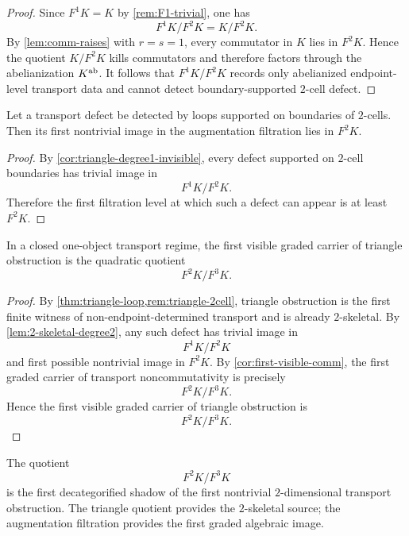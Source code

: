 \begin{proof}
	Since \(F^1K=K\) by \cref{rem:F1-trivial}, one has
	\[
		F^1K/F^2K=K/F^2K.
	\]
	By \cref{lem:comm-raises} with \(r=s=1\), every commutator in \(K\)
	lies in \(F^2K\).  Hence the quotient \(K/F^2K\) kills commutators and
	therefore factors through the abelianization \(K^{\operatorname{ab}}\).  It follows
	that \(F^1K/F^2K\) records only abelianized endpoint-level transport
	data and cannot detect boundary-supported \(2\)-cell defect.
\end{proof}
\begin{lemma}
	\label{lem:2-skeletal-degree2}
	Let a transport defect be detected by loops supported on boundaries of
	\(2\)-cells.  Then its first nontrivial image in the augmentation
	filtration lies in \(F^2K\).
\end{lemma}
\begin{proof}
	By \cref{cor:triangle-degree1-invisible}, every defect supported on
	\(2\)-cell boundaries has trivial image in
	\[
		F^1K/F^2K.
	\]
	Therefore the first filtration level at which such a defect can appear
	is at least \(F^2K\).
\end{proof}
\begin{theorem}
	\label{thm:triangle-degree2}
	In a closed one-object transport regime, the first visible graded
	carrier of triangle obstruction is the quadratic quotient
	\[
		F^2K/F^3K.
	\]
\end{theorem}
\begin{proof}
	By \cref{thm:triangle-loop,rem:triangle-2cell}, triangle obstruction is
	the first finite witness of non-endpoint-determined transport and is
	already \(2\)-skeletal.  By \cref{lem:2-skeletal-degree2}, any such
	defect has trivial image in
	\[
		F^1K/F^2K
	\]
	and first possible nontrivial image in \(F^2K\).  By
	\cref{cor:first-visible-comm}, the first graded carrier of transport
	noncommutativity is precisely
	\[
		F^2K/F^3K.
	\]
	Hence the first visible graded carrier of triangle obstruction is
	\[
		F^2K/F^3K.
	\]
\end{proof}
\begin{remark}
	The quotient
	\[
		F^2K/F^3K
	\]
	is the first decategorified shadow of the first nontrivial
	\(2\)-dimensional transport obstruction.  The triangle quotient
	provides the \(2\)-skeletal source; the augmentation filtration
	provides the first graded algebraic image.
\end{remark}
